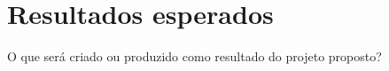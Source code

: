 \chapter{Resultados esperados}\label{chp:resultadosEsparados}
O que será criado ou produzido como resultado do projeto proposto?